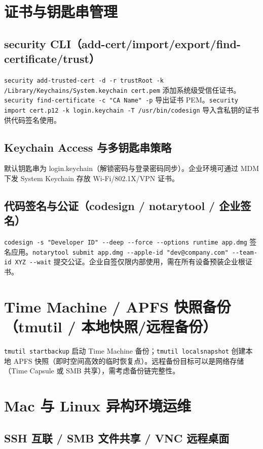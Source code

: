 \documentclass[12pt,UTF8]{ctexbook}
\begin{document}
  \section{证书与钥匙串管理}
    \subsection{security CLI（add-cert/import/export/find-certificate/trust）}

\verb|security add-trusted-cert -d -r trustRoot -k /Library/Keychains/System.keychain cert.pem| 添加系统级受信任证书。\verb|security find-certificate -c "CA Name" -p| 导出证书 PEM。\verb|security import cert.p12 -k login.keychain -T /usr/bin/codesign| 导入含私钥的证书供代码签名使用。

    \subsection{Keychain Access 与多钥匙串策略}

默认钥匙串为 login.keychain（解锁密码与登录密码同步）。企业环境可通过 MDM 下发 System Keychain 存放 Wi-Fi/802.1X/VPN 证书。

    \subsection{代码签名与公证（codesign / notarytool / 企业签名）}

\verb|codesign -s "Developer ID" --deep --force --options runtime app.dmg| 签名应用。\verb|notarytool submit app.dmg --apple-id "dev@company.com" --team-id XYZ --wait| 提交公证。企业自签仅限内部使用，需在所有设备预装企业根证书。

  \section{Time Machine / APFS 快照备份（tmutil / 本地快照/远程备份）}

\verb|tmutil startbackup| 启动 Time Machine 备份；\verb|tmutil localsnapshot| 创建本地 APFS 快照（即时空间高效的临时恢复点）。远程备份目标可以是网络存储（Time Capsule 或 SMB 共享），需考虑备份链完整性。

  \section{Mac 与 Linux 异构环境运维}
    \subsection{SSH 互联 / SMB 文件共享 / VNC 远程桌面}
\end{document}
